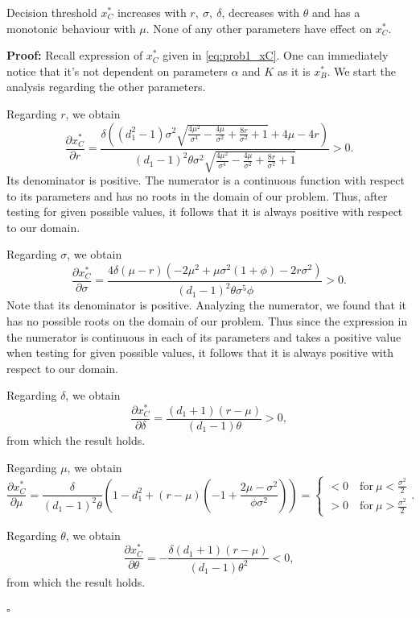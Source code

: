 \begin{prop}
	\label{1_prop2}
Decision threshold $x^*_C$ increases with $r, \ \sigma,\ \delta$, decreases with $\theta$ and has a monotonic behaviour with  $\mu$. None of any other parameters have effect on $x^*_C$.
\end{prop}

\textbf{Proof:}
Recall expression of $x^*_C$ given in \eqref{eq:prob1_xC}. One can immediately notice that it's not dependent on parameters $\alpha$ and $K$ as it is $x^*_B$. We start the analysis regarding the other parameters. 

Regarding $r$, we obtain
$$\frac{\partial x^*_C}{\partial r}=\frac{\delta  \left(\left(d_1^2-1\right) \sigma ^2 \sqrt{\frac{4 \mu ^2}{\sigma ^4}-\frac{4 \mu }{\sigma ^2}+\frac{8 r}{\sigma ^2}+1}+4 \mu -4 r\right)}{(d_1-1)^2 \theta  \sigma ^2 \sqrt{\frac{4 \mu ^2}{\sigma ^4}-\frac{4 \mu }{\sigma ^2}+\frac{8 r}{\sigma ^2}+1}}>0.$$
Its denominator is positive. The numerator is a continuous function with respect to its parameters and has no roots in the domain of our problem. Thus, after testing for given possible values, it follows that it is always positive with respect to our domain.


Regarding $\sigma$, we obtain
$$\frac{\partial x^*_C}{\partial \sigma}=\frac{4 \delta  (\mu -r) \left(-2 \mu ^2+\mu  \sigma ^2 (1+\phi)-2 r \sigma ^2\right)}{(d_1-1)^2 \theta  \sigma ^5 \phi}>0.$$
Note that its denominator is positive.
Analyzing the numerator, we found that it has no possible roots on the domain of our problem. Thus since the expression in the numerator is continuous in each of its parameters and takes a positive value when testing for given possible values, it follows that it is always positive with respect to our domain.

Regarding $\delta$, we obtain
$$\frac{\partial x^*_C}{\partial \delta}=\frac{(d_1+1) (r-\mu )}{(d_1-1) \theta }>0,$$
from which the result holds.

Regarding $\mu$, we obtain
$$\frac{\partial x^*_C}{\partial \mu}=\frac{\delta}{(d_1-1)^2 \theta} \left( 1-d_1^2 +(r-\mu)\left(-1+\frac{2\mu-\sigma^2}{\phi \sigma^2} \right) \right)= \begin{cases}
<0 \quad \text{for} \ \mu<\frac{\sigma^2}{2}\\
>0 \quad \text{for} \ \mu>\frac{\sigma^2}{2}
\end{cases}.$$


Regarding $\theta$, we obtain
$$\frac{\partial x^*_C}{\partial \theta}=-\frac{\delta  (d_1+1) (r-\mu )}{(d_1-1) \theta^2}<0,$$
from which the result holds.
\begin{flushright}
 $\square$
\end{flushright}


